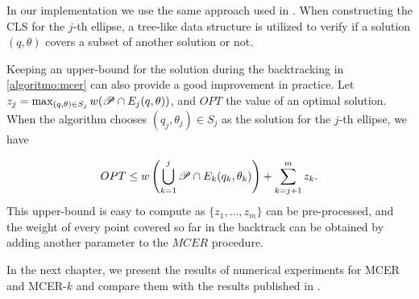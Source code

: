 In our implementation we use the same approach used in . When constructing the CLS for the $j$-th ellipse, a tree-like data structure is utilized to verify if a solution $(q, \theta)$ covers a subset of another solution or not.

Keeping an upper-bound for the solution during the backtracking in \autoref{algoritmo:mcer} can also provide a good improvement in practice. Let $z_j = \max_{(q, \theta) \in S_j} w(\mathscr{P} \cap E_j(q, \theta))$, and $OPT$ the value of an optimal solution. When the algorithm chooses $(q_j, \theta_j) \in S_j$ as the solution for the $j$-th ellipse, we have

\begin{equation}
OPT \le w\left(\bigcup_{k=1}^{j} \mathscr{P} \cap E_k(q_k, \theta_k)\right) + \sum_{k=j+1}^m z_k.
\end{equation}
This upper-bound is easy to compute as $\{z_1, \dots, z_m\}$ can be pre-processed, and the weight of every point covered so far in the backtrack can be obtained by adding another parameter to the $MCER$ procedure.

In the next chapter, we present the results of numerical experiments for MCER and MCER-$k$ and compare them with the results published in .